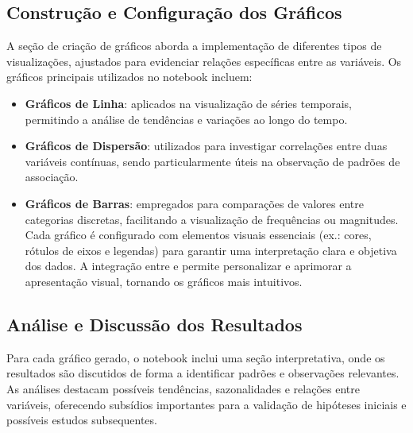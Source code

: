 \documentclass[12pt, openright, oneside, a4paper, chapter=TITLE, section=TITLE, subsection=TITLE, subsubsection=TITLE, brazil]{abntex2}
\begin{document}
\subsection{Construção e Configuração dos Gráficos}
\hspace{1.25cm}A seção de criação de gráficos aborda a implementação de diferentes tipos de visualizações, ajustados para evidenciar relações específicas entre as variáveis. Os gráficos principais utilizados no notebook incluem:
\begin{itemize}
    \item \textbf{Gráficos de Linha}: aplicados na visualização de séries temporais, permitindo a análise de tendências e variações ao longo do tempo.
    \item \textbf{Gráficos de Dispersão}: utilizados para investigar correlações entre duas variáveis contínuas, sendo particularmente úteis na observação de padrões de associação.
    \item \textbf{Gráficos de Barras}: empregados para comparações de valores entre categorias discretas, facilitando a visualização de frequências ou magnitudes.
\hspace{1.25cm}Cada gráfico é configurado com elementos visuais essenciais (ex.: cores, rótulos de eixos e legendas) para garantir uma interpretação clara e objetiva dos dados. A integração entre  e  permite personalizar e aprimorar a apresentação visual, tornando os gráficos mais intuitivos.
\end{itemize}

\subsection{Análise e Discussão dos Resultados}
\hspace{1.25cm}Para cada gráfico gerado, o notebook inclui uma seção interpretativa, onde os resultados são discutidos de forma a identificar padrões e observações relevantes. As análises destacam possíveis tendências, sazonalidades e relações entre variáveis, oferecendo subsídios importantes para a validação de hipóteses iniciais e possíveis estudos subsequentes.

\end{document}
